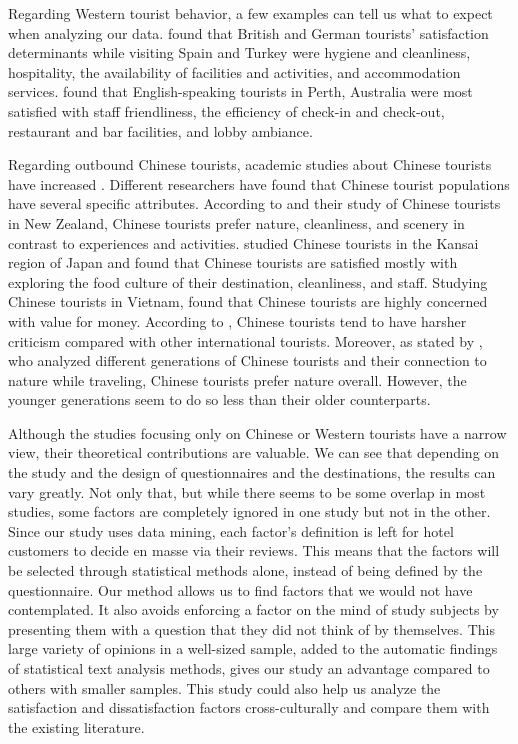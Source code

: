 \documentclass[smallextended,natbib]{svjour3}       %
\begin{document}
    Regarding Western tourist behavior, a few examples can tell us what to expect when analyzing our data. \cite{kozak2002} found that British and German tourists' satisfaction determinants while visiting Spain and Turkey were hygiene and cleanliness, hospitality, the availability of facilities and activities, and accommodation services. \cite{shanka2004} found that English-speaking tourists in Perth, Australia were most satisfied with staff friendliness, the efficiency of check-in and check-out, restaurant and bar facilities, and lobby ambiance. 

    Regarding outbound Chinese tourists, academic studies about Chinese tourists have increased \cite[][]{sun2017}. Different researchers have found that Chinese tourist populations have several specific attributes. According to \cite{ryan2001} and their study of Chinese tourists in New Zealand, Chinese tourists prefer nature, cleanliness, and scenery in contrast to experiences and activities. \cite{dongyang2015} studied Chinese tourists in the Kansai region of Japan and found that Chinese tourists are satisfied mostly with exploring the food culture of their destination, cleanliness, and staff. Studying Chinese tourists in Vietnam, \cite{truong2009} found that Chinese tourists are highly concerned with value for money. According to \cite{liu2019}, Chinese tourists tend to have harsher criticism compared with other international tourists. Moreover, as stated by \cite{gao2017chinese}, who analyzed different generations of Chinese tourists and their connection to nature while traveling, Chinese tourists prefer nature overall. However, the younger generations seem to do so less than their older counterparts. 

    Although the studies focusing only on Chinese or Western tourists have a narrow view, their theoretical contributions are valuable. We can see that depending on the study and the design of questionnaires and the destinations, the results can vary greatly. Not only that, but while there seems to be some overlap in most studies, some factors are completely ignored in one study but not in the other. Since our study uses data mining, each factor's definition is left for hotel customers to decide en masse via their reviews. This means that the factors will be selected through statistical methods alone, instead of being defined by the questionnaire. Our method allows us to find factors that we would not have contemplated. It also avoids enforcing a factor on the mind of study subjects by presenting them with a question that they did not think of by themselves. This large variety of opinions in a well-sized sample, added to the automatic findings of statistical text analysis methods, gives our study an advantage compared to others with smaller samples. This study could also help us analyze the satisfaction and dissatisfaction factors cross-culturally and compare them with the existing literature.
\end{document}
